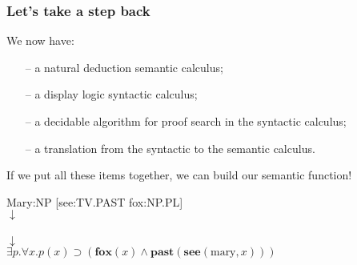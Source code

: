 \documentclass[11pt,t]{beamer}
\begin{document}
\begin{frame}
  \frametitle{Let's take a step back}
  We now have:
  \vfill
  \begin{itemize}
    \item[--] a natural deduction semantic calculus;
    \item[--] a display logic syntactic calculus;
    \item[--] a decidable algorithm for proof search in the syntactic
          calculus;
    \item[--] a translation from the syntactic to the semantic calculus.
  \end{itemize}
  \vfill
  If we put all these items together, we can build our semantic
  function!
  \begin{center}
    Mary:NP [see:TV.PAST fox:NP.PL]
    \\
    $\downarrow$
    \\
    \\
    $\downarrow$
    \\
    $\exists p.\forall x.p(x) \supset (\mathbf{fox}(x) \land
      \mathbf{past}(\mathbf{see}(\text{mary},x)))$
  \end{center}
\end{frame}

\end{document}
